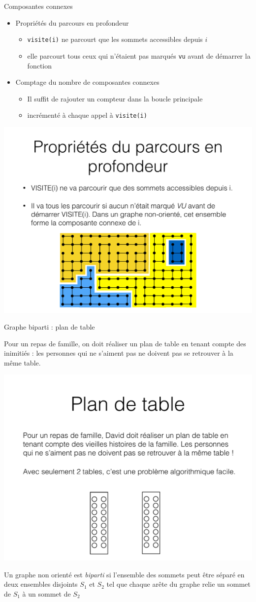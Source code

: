 \begin{frame}{Composantes connexes}
    \begin{itemize}
        \item Propriétés du parcours en profondeur
        \begin{itemize}
            \item \texttt{visite(i)} ne parcourt que les sommets accessibles depuis $i$ 
            \item elle parcourt tous ceux qui n'étaient pas marqués \texttt{vu} avant de démarrer la fonction 
        \end{itemize}
        \item Comptage du nombre de composantes connexes 
        \begin{itemize}
            \item Il suffit de rajouter un compteur dans la boucle principale 
            \item incrémenté à chaque appel à \texttt{visite(i)}
        \end{itemize}
    \end{itemize}
    \begin{center}
        \includegraphics[width=.5\textwidth]{fig/cc.pdf}
    \end{center}
\end{frame}

\begin{frame}{Graphe biparti : plan de table}
    \begin{example}
        Pour un repas de famille, on doit réaliser un plan de table en tenant compte des inimitiés : les personnes qui ne s'aiment pas ne doivent pas se retrouver à la même table.        
    \end{example}
    \begin{center}
        \includegraphics[width=.2\textwidth]{fig/plandetable.pdf}
    \end{center}
    \begin{definition}
        Un graphe non orienté est \emph{biparti} si l'ensemble des sommets peut être séparé en deux ensembles disjoints $S_1$ et $S_2$ tel que chaque arête du graphe relie un sommet de $S_1$ à un sommet de $S_2$ 
    \end{definition}
\end{frame}


